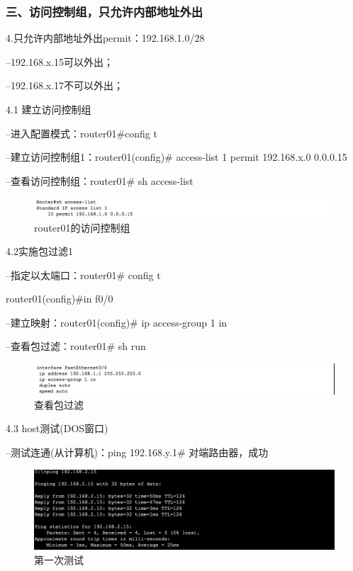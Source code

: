 \documentclass[lang=cn,11pt,a4paper,cite=authoryear]{elegantpaper}
\begin{document}
\subsubsection{三、访问控制组，只允许内部地址外出}

4.只允许内部地址外出permit：192.168.1.0/28

--192.168.x.15可以外出；

--192.168.x.17不可以外出；

4.1 建立访问控制组

--进入配置模式：router01\#config t

--建立访问控制组1：router01(config)\# access-list 1 permit 192.168.x.0  0.0.0.15

--查看访问控制组：router01\# sh access-list

\begin{figure}[htbp]
	\centering
	\includegraphics[width=0.7\linewidth]{image/screenshot033}
	\caption{router01的访问控制组}
	\label{fig:screenshot033}
\end{figure}


4.2实施包过滤1

--指定以太端口：router01\# config t

router01(config)\#in f0/0

--建立映射：router01(config)\# ip access-group 1 in 

--查看包过滤：router01\# sh run

\begin{figure}[htbp]
	\centering
	\includegraphics[width=0.7\linewidth]{image/screenshot034}
	\caption{查看包过滤}
	\label{fig:screenshot034}
\end{figure}


4.3 host测试(DOS窗口)

--测试连通(从计算机)：ping 192.168.y.1\# 对端路由器，成功

\begin{figure}[htbp]
	\centering
	\includegraphics[width=0.7\linewidth]{image/screenshot035}
	\caption{第一次测试}
	\label{fig:screenshot035}
\end{figure}
\end{document}
